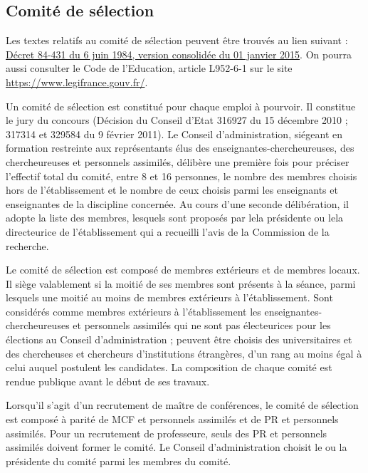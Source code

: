 \subsection{Comit\'e de s\'election}\label{sec. comiteselection}

Les textes relatifs au comit\'e de s\'election peuvent \^etre trouv\'es au lien suivant :
\href{http://www.legifrance.gouv.fr/affichTexte.do;jsessionid=E1D1583A8C612508D9955CAB27DB96E0.tpdjo12v_3&dateTexte%
=?cidTexte=JORFTEXT000000520453&categorieLien=cid}{D\'ecret 84-431 du 6 juin 1984, version consolid\'ee du 01 janvier 2015}. 
On pourra aussi consulter le Code de l'Education, article L952-6-1 sur le
site \url{https://www.legifrance.gouv.fr/}.


Un comit\'e de s\'election est constitu\'e pour chaque emploi \`a pourvoir. Il constitue le jury du concours 
(D\'ecision du Conseil d'Etat 316927 du 15 d\'ecembre 2010 ; 317314 et 329584 du 9 f\'evrier 2011). 
Le Conseil d'administration, si\'egeant en formation
restreinte aux repr\'esentants \'elus des enseignant\mp e\mp s-chercheur\mp euse\mp s, des chercheur\mp euse\mp s et personnels assimil\'es, d\'elib\`ere
une premi\`ere fois pour pr\'eciser l'effectif total du comit\'e, entre 8 et 16 personnes, le nombre des membres choisis hors de
l'\'etablissement et le nombre de ceux choisis parmi les enseignants et enseignantes de la discipline concern\'ee. Au cours d'une
seconde d\'elib\'eration, il adopte la liste des membres, lesquels sont propos\'es par le\mp la pr\'esident\mp e ou le\mp la directeur\mp ice de
l'\'etablissement qui a recueilli l'avis de la Commission de la recherche.

Le comit\'e de s\'election est compos\'e de membres ext\'erieurs et de membres \og locaux\fg{}. Il si\`ege valablement si la moiti\'e de ses membres sont pr\'esents \`a la s\'eance, parmi lesquels une moiti\'e au moins de membres ext\'erieurs \`a l'\'etablissement. Sont consid\'er\'es comme membres ext\'erieurs \`a l'\'etablissement les enseignant\mp e\mp s-chercheur\mp euse\mp s et personnels assimil\'es qui ne sont pas \'electeur\mp ice\mp s pour les \'elections
au Conseil d'administration ; peuvent \^etre choisis des universitaires et des chercheuses et chercheurs d'institutions \'etrang\`eres,
d'un rang au moins \'egal \`a celui auquel postulent les candidat\mp e\mp s. La composition de chaque comit\'e est rendue
publique avant le d\'ebut de ses travaux.

Lorsqu'il s'agit d'un recrutement de ma\^itre de conf\'erences, le comit\'e de s\'election est compos\'e \`a parit\'e de MCF
et personnels assimil\'es et de PR et personnels assimil\'es. Pour un recrutement de professeur\mp e, seuls des PR et
personnels assimil\'es doivent former le comit\'e. Le Conseil d'administration choisit le ou la pr\'esident\mp e du comit\'e parmi les
membres du comit\'e.

